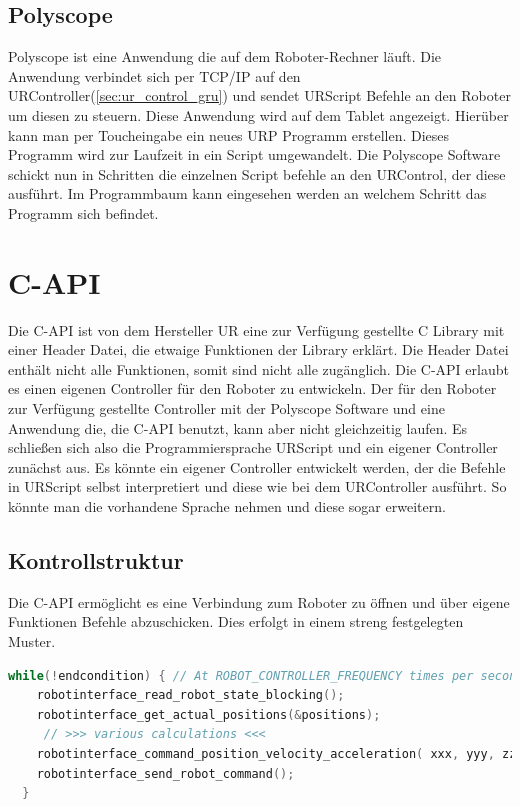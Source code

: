 \subsection{Polyscope}
\label{urcontrol_polyscope_gru}

Polyscope ist eine Anwendung die auf dem Roboter-Rechner läuft. Die Anwendung verbindet sich per \acs{TCP/IP} auf den URController(\ref{sec:ur_control_gru}) und sendet URScript Befehle an den Roboter um diesen zu steuern.
Diese Anwendung wird auf dem Tablet angezeigt. Hierüber kann man per Toucheingabe ein neues \acs{URP} Programm erstellen. Dieses Programm wird zur Laufzeit in ein Script umgewandelt. Die Polyscope Software schickt nun in Schritten die einzelnen Script befehle an den URControl, der diese ausführt. Im Programmbaum kann eingesehen werden an welchem Schritt das Programm sich befindet.

\section{C-API}
\label{sec:rest_prinzip_gru}

Die C-\ac{API} ist von dem Hersteller \acs{UR} eine zur Verfügung gestellte C \acs{Library} mit einer Header Datei, die etwaige Funktionen der Library erklärt. Die Header Datei enthält nicht alle Funktionen, somit sind nicht alle zugänglich. Die C-\acs{API} erlaubt es einen eigenen Controller für den Roboter zu entwickeln. Der für den Roboter zur Verfügung gestellte Controller mit der Polyscope Software und eine Anwendung die, die C-\acs{API} benutzt, kann aber nicht gleichzeitig laufen. Es schließen sich also die Programmiersprache URScript und ein eigener Controller zunächst aus. Es könnte ein eigener Controller entwickelt werden, der die Befehle in URScript selbst interpretiert und diese wie bei dem URController ausführt. So könnte man die vorhandene Sprache nehmen und diese sogar erweitern.

\subsection{Kontrollstruktur}
\label{capi_control_loop_gru}	

Die C-\acs{API} ermöglicht es eine Verbindung zum Roboter zu öffnen und über eigene Funktionen Befehle abzuschicken. Dies erfolgt in einem streng festgelegten Muster.

\begin{lstlisting}[language=C,caption={Beispiel der Kontroll Struktur}, label=lst:robot_control_loop,captionpos=b]
  while(!endcondition) { // At ROBOT_CONTROLLER_FREQUENCY times per second
    robotinterface_read_robot_state_blocking();
    robotinterface_get_actual_positions(&positions);
     // >>> various calculations <<<
    robotinterface_command_position_velocity_acceleration( xxx, yyy, zzz);
    robotinterface_send_robot_command();
  }
\end{lstlisting}

